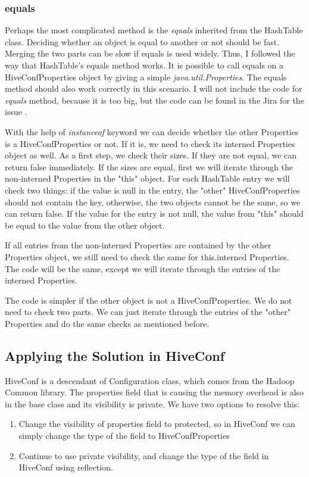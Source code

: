 \subsubsection{equals}
Perhaps the most complicated method is the \textit{equals} inherited from the HashTable class. Deciding whether an object is equal to another or not should be fast. Merging the two parts can be slow if equals is used widely. Thus, I followed the way that HashTable's equals method works. It is possible to call equals on a HiveConfProperties object by giving a simple \textit{java.util.Properties}. The equals method should also work correctly in this scenario. I will not include the code for \textit{equals} method, because it is too big, but the code can be found in the Jira for the issue \cite{hive-conf}.

With the help of \textit{instanceof} keyword we can decide whether the other Properties is a HiveConfProperties or not. If it is, we need to check its interned Properties object as well. As a first step, we check their sizes. If they are not equal, we can return false immediately. If the sizes are equal, first we will iterate through the non-interned Properties in the "this" object. For each HashTable entry we will check two things: if the value is null in the entry, the "other" HiveConfProperties should not contain the key, otherwise, the two objects cannot be the same, so we can return false. If the value for the entry is not null, the value from "this" should be equal to the value from the other object. 

If all entries from the non-interned Properties are contained by the other Properties object, we still need to check the same for this.interned Properties. The code will be the same, except we will iterate through the entries of the interned Properties. 

The code is simpler if the other object is not a HiveConfProperties. We do not need to check two parts. We can just iterate through the entries of the "other" Properties and do the same checks as mentioned before.

\subsection{Applying the Solution in HiveConf}
HiveConf is a descendant of Configuration class, which comes from the Hadoop Common library. The properties field that is causing the memory overhead is also in the base class and its visibility is private. We have two options to resolve this:
\begin{enumerate}
	\item Change the visibility of properties field to protected, so in HiveConf we can simply change the type of the field to HiveConfProperties
	\item Continue to use private visibility, and change the type of the field in HiveConf using reflection.
\end{enumerate}

